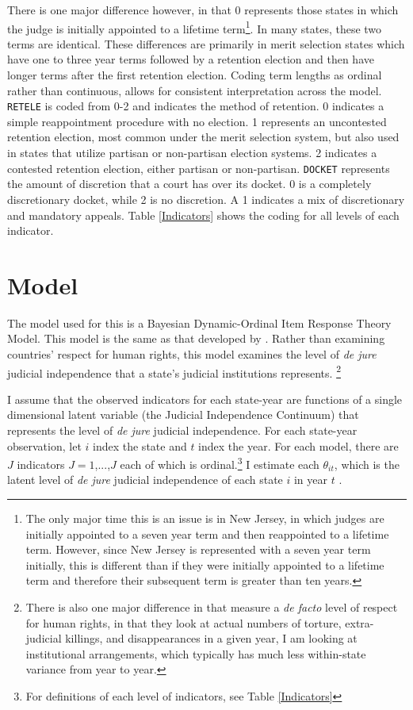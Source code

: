 \documentclass[12pt]{article}
\begin{document}
There is one major difference however, in that 0 represents those states in which the judge is initially appointed to a lifetime term\footnote{The only major time this is an issue is in New Jersey, in which judges are initially appointed to a seven year term and then reappointed to a lifetime term.  However, since New Jersey is represented with a seven year term initially, this is different than if they were initially appointed to a lifetime term and therefore their subsequent term is greater than ten years.}.  In many states, these two terms are identical.  These differences are primarily in merit selection states which have one to three year terms followed by a retention election and then have longer terms after the first retention election.  Coding term lengths as ordinal rather than continuous, allows for consistent interpretation across the model.  \texttt{RETELE} is coded from 0-2 and indicates the method of retention.  0 indicates a simple reappointment procedure with no election.  1 represents an uncontested retention election, most common under the merit selection system, but also used in states that utilize partisan or non-partisan election systems.  2 indicates a contested retention election, either partisan or non-partisan.  \texttt{DOCKET} represents the amount of discretion that a court has over its docket.  0 is a completely discretionary docket, while 2 is no discretion.  A 1 indicates a mix of discretionary and mandatory appeals. Table \ref{Indicators} shows the coding for all levels of each indicator. 

\section{Model}\label{Model}
The model used for this is a Bayesian Dynamic-Ordinal Item Response Theory Model.  This model is the same as that developed by \citet{Schnakenberg2014}.  Rather than examining countries' respect for human rights, this model examines the level of \textit{de jure} judicial independence that a state's judicial institutions represents. \footnote{There is also one major difference in that \citeauthor{Schnakenberg2014} measure a \textit{de facto} level of respect for human rights, in that they look at actual numbers of torture, extra-judicial killings, and disappearances in a given year, I am looking at institutional arrangements, which typically has much less within-state variance from year to year.}	

I assume that the observed indicators for each state-year are functions of a single dimensional latent variable (the Judicial Independence Continuum) that represents the level of \textit{de jure} judicial independence.  For each state-year observation, let $i$ index the state and $t$ index the year.  For each model, there are $J$ indicators $J=1$,...,$J$ each of which is ordinal.\footnote{For definitions of each level of indicators, see Table \ref{Indicators}} I estimate each $\theta_{it}$, which is the latent level of \textit{de jure} judicial independence of each state $i$ in year $t$ \citep[7]{Schnakenberg2014}.
\end{document}
